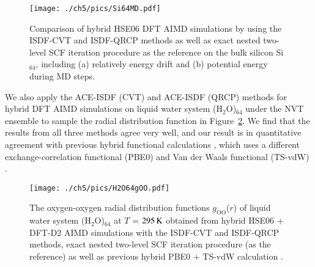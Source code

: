 \begin{figure}[htbp]
	\begin{center}
		\texttt{[image: ./ch5/pics/Si64MD.pdf]}
	\end{center}
	\caption{Comparison of hybrid HSE06 DFT AIMD simulations by using
	the ISDF-CVT and ISDF-QRCP methods as well as exact nested two-level
	SCF iteration procedure as the reference on the bulk silicon
	Si$_{64}$, including (a) relatively energy drift and (b) potential
	energy during MD steps.} \label{fig:Si64MD}
\end{figure}
\FloatBarrier

We also apply the ACE-ISDF (CVT) and ACE-ISDF (QRCP) methods for hybrid DFT AIMD
simulations on liquid water system (H$_2$O)$_{64}$ under the NVT ensemble to
sample the radial distribution function in Figure~\ref{fig:H2O64gOO}. We find
that the results from all three methods agree very well, and our result is in
quantitative agreement with previous hybrid functional calculations
\cite{JCP_141_084502_2014}, which uses a different exchange-correlation
functional (PBE0) and Van der Waals functional (TS-vdW) 
\cite{PRL_102_073005_2009}.

\begin{figure}[htbp]
	\begin{center}
		\texttt{[image: ./ch5/pics/H2O64gOO.pdf]}
	\end{center}
	\caption{The oxygen-oxygen radial distribution functions $g_\text{OO}$($r$) of
	liquid water system (H$_2$O)$_{64}$ at $T$ = $295\operatorname{K}$ obtained from hybrid
	HSE06 + DFT-D2 AIMD simulations with the ISDF-CVT and ISDF-QRCP methods, exact
	nested two-level SCF iteration procedure (as the reference) as well as
	previous hybrid PBE0 + TS-vdW calculation \cite{JCP_141_084502_2014}.}
	\label{fig:H2O64gOO}
\end{figure}
\FloatBarrier
